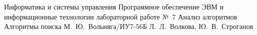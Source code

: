 \documentclass{bmstu}
\begin{document}
	
	\makereporttitle
	{Информатика и системы управления} %
	{Программное обеспечение ЭВМ и информационные технологии} %
	{лабораторной работе №~7} %
	{Анализ алгоритмов} %
	{Алгоритмы поиска} %
	{} %
	{М.~Ю.~Вольняга/ИУ7-56Б} %
	{Л.~Л.~Волкова, Ю.~В.~Строганов} %
	

    \maketableofcontents
    
    
    
    
    
    
    \makebibliography
\end{document}
